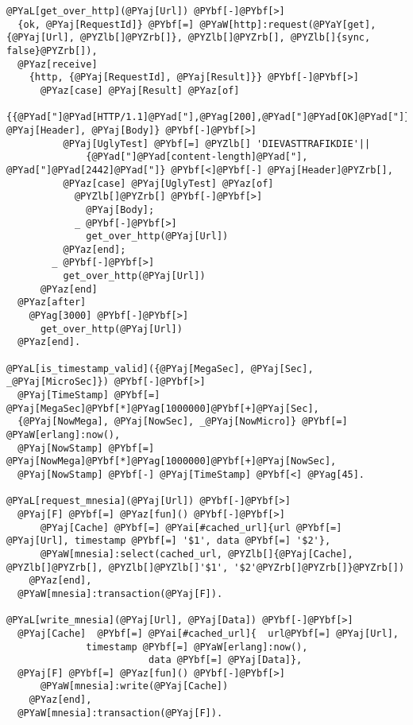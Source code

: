 \begin{Verbatim}[commandchars=@\[\]]
@PYaL[get_over_http](@PYaj[Url]) @PYbf[-]@PYbf[>]
  {ok, @PYaj[RequestId]} @PYbf[=] @PYaW[http]:request(@PYaY[get], {@PYaj[Url], @PYZlb[]@PYZrb[]}, @PYZlb[]@PYZrb[], @PYZlb[]{sync, false}@PYZrb[]),
  @PYaz[receive]
    {http, {@PYaj[RequestId], @PYaj[Result]}} @PYbf[-]@PYbf[>]
      @PYaz[case] @PYaj[Result] @PYaz[of]
        {{@PYad["]@PYad[HTTP/1.1]@PYad["],@PYag[200],@PYad["]@PYad[OK]@PYad["]}, @PYaj[Header], @PYaj[Body]} @PYbf[-]@PYbf[>]
          @PYaj[UglyTest] @PYbf[=] @PYZlb[] 'DIEVASTTRAFIKDIE'||
              {@PYad["]@PYad[content-length]@PYad["], @PYad["]@PYad[2442]@PYad["]} @PYbf[<]@PYbf[-] @PYaj[Header]@PYZrb[],
          @PYaz[case] @PYaj[UglyTest] @PYaz[of]
            @PYZlb[]@PYZrb[] @PYbf[-]@PYbf[>]
              @PYaj[Body];
            _ @PYbf[-]@PYbf[>]
              get_over_http(@PYaj[Url])
          @PYaz[end];
        _ @PYbf[-]@PYbf[>]
          get_over_http(@PYaj[Url])
      @PYaz[end]
  @PYaz[after]
    @PYag[3000] @PYbf[-]@PYbf[>]
      get_over_http(@PYaj[Url])
  @PYaz[end].

@PYaL[is_timestamp_valid]({@PYaj[MegaSec], @PYaj[Sec], _@PYaj[MicroSec]}) @PYbf[-]@PYbf[>]
  @PYaj[TimeStamp] @PYbf[=] @PYaj[MegaSec]@PYbf[*]@PYag[1000000]@PYbf[+]@PYaj[Sec],
  {@PYaj[NowMega], @PYaj[NowSec], _@PYaj[NowMicro]} @PYbf[=] @PYaW[erlang]:now(),
  @PYaj[NowStamp] @PYbf[=] @PYaj[NowMega]@PYbf[*]@PYag[1000000]@PYbf[+]@PYaj[NowSec],
  @PYaj[NowStamp] @PYbf[-] @PYaj[TimeStamp] @PYbf[<] @PYag[45].

@PYaL[request_mnesia](@PYaj[Url]) @PYbf[-]@PYbf[>]
  @PYaj[F] @PYbf[=] @PYaz[fun]() @PYbf[-]@PYbf[>]
      @PYaj[Cache] @PYbf[=] @PYai[#cached_url]{url @PYbf[=] @PYaj[Url], timestamp @PYbf[=] '$1', data @PYbf[=] '$2'},
      @PYaW[mnesia]:select(cached_url, @PYZlb[]{@PYaj[Cache], @PYZlb[]@PYZrb[], @PYZlb[]@PYZlb[]'$1', '$2'@PYZrb[]@PYZrb[]}@PYZrb[])
    @PYaz[end],
  @PYaW[mnesia]:transaction(@PYaj[F]).
  
@PYaL[write_mnesia](@PYaj[Url], @PYaj[Data]) @PYbf[-]@PYbf[>]
  @PYaj[Cache]  @PYbf[=] @PYai[#cached_url]{  url@PYbf[=] @PYaj[Url],
              timestamp @PYbf[=] @PYaW[erlang]:now(),
                         data @PYbf[=] @PYaj[Data]},
  @PYaj[F] @PYbf[=] @PYaz[fun]() @PYbf[-]@PYbf[>]
      @PYaW[mnesia]:write(@PYaj[Cache])
    @PYaz[end],
  @PYaW[mnesia]:transaction(@PYaj[F]).
\end{Verbatim}
